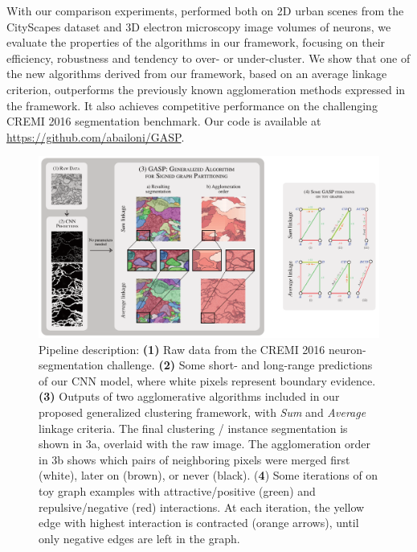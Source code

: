 With our comparison experiments, performed both on 2D urban scenes from the CityScapes dataset and 3D electron microscopy image volumes of neurons, we evaluate the properties of the algorithms in our framework, focusing on their efficiency, robustness and tendency to over- or under-cluster.
We show that one of the new algorithms derived from our framework, based on an average linkage criterion, outperforms the previously known agglomeration methods expressed in the framework. It also achieves competitive performance on the challenging CREMI 2016 segmentation benchmark.
Our code is available at \url{https://github.com/abailoni/GASP}.



\begin{figure}[t]
\centering
\includegraphics[width=\textwidth]{./figs/intro_image_v3.pdf} %
\caption{ Pipeline description: \textbf{(1)} Raw data from the CREMI 2016 neuron-segmentation challenge. \textbf{(2)} Some short- and long-range predictions of our CNN model, where white pixels represent boundary evidence. \textbf{(3)} Outputs of two agglomerative algorithms included in our proposed generalized clustering framework, with \emph{Sum} and \emph{Average} linkage criteria. The final clustering / instance segmentation is shown in 3a, overlaid with the raw image.  The  agglomeration order in 3b shows which pairs of neighboring pixels were merged first (white), later on (brown), or never (black). (\textbf{4}) Some iterations of \algname{} on toy graph examples with attractive/positive (green) and repulsive/negative (red) interactions. At each iteration, the yellow edge with highest interaction is contracted (orange arrows), until only negative edges are left in the graph.
\label{fig:intro_figure}}
\end{figure}
